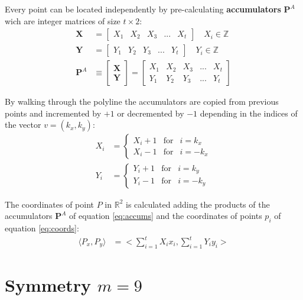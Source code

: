 \documentclass[11pt]{article}
\begin{document}
Every point can be located independently by pre-calculating \textbf{accumulators} $\textbf{P}^A$ wich are integer matrices of size $t\times 2$:
\begin{align}
\textbf{X} &= \left[\begin{array}{ccccc}X_1&X_2&X_3&...&X_t
 \end{array}\right]  \quad X_i \in \mathbb{Z}\\
\textbf{Y} &= \left[\begin{array}{ccccc}Y_1&Y_2&Y_3&...&Y_t
 \end{array}\right]  \quad Y_i \in \mathbb{Z}\\
\textbf{P}^A &\equiv \left[\begin{array}{c}\textbf{X} \\ \textbf{Y}
 \end{array}\right]
 = \left[\begin{array}{ccccc}X_1&X_2&X_3&...&X_t
  \\ Y_1&Y_2&Y_3&...&Y_t \end{array}\right] \label{eq:accums}
\end{align}

By walking through the polyline the accumulators are copied from previous points and incremented by $+1$ or decremented by $-1$ depending in the indices of the vector $v = (k_x,k_y)$:
\begin{align}
X_i &= \left\{ \begin{array}{ccl}
 X_i + 1 & \mbox{for} & i = k_x \\
 X_i - 1 & \mbox{for} & i = -k_x
 \end{array}\right. \\
Y_i &= \left\{ \begin{array}{ccl}
 Y_i + 1 & \mbox{for} & i = k_y \\
 Y_i - 1 & \mbox{for} & i = -k_y
 \end{array}\right.
\end{align}

The coordinates of point $P$ in $\mathbb{R}^2$ is calculated adding the products of the accumulators $\textbf{P}^A$ of equation \ref{eq:accums} and the coordinates of points $p_i$ of equation \ref{eq:coords}:
\begin{align}
\langle P_x,P_y\rangle &= 
 \biggl< \sum_{i=1}^{t}X_ix_i, \sum_{i=1}^{t}Y_iy_i \biggr> \label{eq:absolute}
\end{align}




\section{Symmetry $m=9$}
\end{document}
